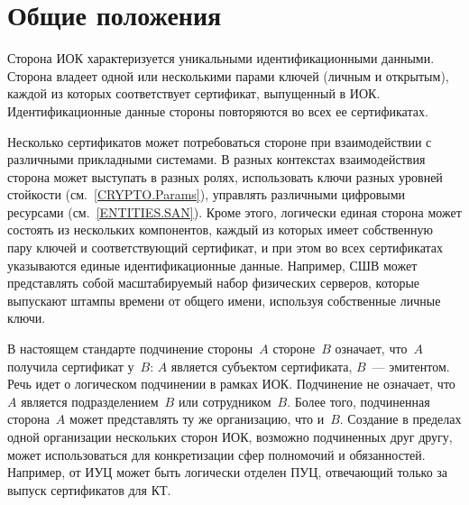 \section{Общие положения}\label{ENTITIES.Common}

Сторона ИОК характеризуется уникальными идентификационными данными.
%
Сторона владеет одной или несколькими парами ключей (личным и открытым),
каждой из которых соответствует сертификат, выпущенный в ИОК. 
%
Идентификационные данные стороны повторяются во всех ее сертификатах.

Несколько сертификатов может потребоваться стороне при взаимодействии с
различными прикладными системами. В разных контекстах взаимодействия сторона
может выступать в разных ролях, использовать ключи разных уровней стойкости
(см.~\ref{CRYPTO.Params}), управлять различными цифровыми ресурсами
(см.~\ref{ENTITIES.SAN}).
%
Кроме этого, логически единая сторона может состоять из нескольких компонентов,
каждый из которых имеет собственную пару ключей и соответствующий сертификат, и
при этом во всех сертификатах указываются единые идентификационные данные.
%
Например, СШВ может представлять собой масштабируемый набор физических серверов,
которые выпускают штампы времени от общего имени, используя собственные личные
ключи.

В настоящем стандарте подчинение стороны~$A$ стороне~$B$ означает, что~$A$
получила сертификат у~$B$: $A$ является субъектом сертификата, $B$~---
эмитентом.
%
Речь идет о логическом подчинении в рамках ИОК. Подчинение не означает, что~$A$
является подразделением~$B$ или сотрудником~$B$. Более того, подчиненная
сторона~$A$ может представлять ту же организацию, что и~$B$.
%
Создание в пределах одной организации нескольких сторон ИОК, возможно 
подчиненных друг другу, может использоваться для конкретизации сфер полномочий 
и обязанностей.
%
Например, от ИУЦ может быть логически отделен ПУЦ, отвечающий только
за выпуск сертификатов для КТ.
